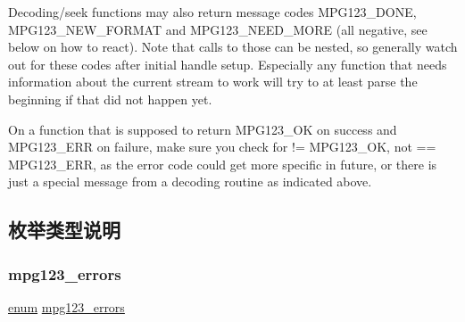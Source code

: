 Decoding/seek functions may also return message codes M\+P\+G123\+\_\+\+D\+O\+NE, M\+P\+G123\+\_\+\+N\+E\+W\+\_\+\+F\+O\+R\+M\+AT and M\+P\+G123\+\_\+\+N\+E\+E\+D\+\_\+\+M\+O\+RE (all negative, see below on how to react). Note that calls to those can be nested, so generally watch out for these codes after initial handle setup. Especially any function that needs information about the current stream to work will try to at least parse the beginning if that did not happen yet.

On a function that is supposed to return M\+P\+G123\+\_\+\+OK on success and M\+P\+G123\+\_\+\+E\+RR on failure, make sure you check for != M\+P\+G123\+\_\+\+OK, not == M\+P\+G123\+\_\+\+E\+RR, as the error code could get more specific in future, or there is just a special message from a decoding routine as indicated above. 

\subsection{枚举类型说明}
\mbox{\label{group__mpg123__error_gac50432012aeaf7c23014de3198dfa5fd}} 
\subsubsection{\texorpdfstring{mpg123\+\_\+errors}{mpg123\_errors}}
{\footnotesize\ttfamily \hyperlink{interfaceenum}{enum} \hyperlink{group__mpg123__error_gac50432012aeaf7c23014de3198dfa5fd}{mpg123\+\_\+errors}}

